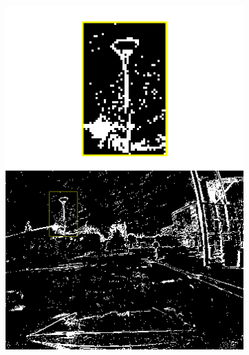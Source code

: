 \begin{figure}[t]
  \centering
  \begin{subfigure}{0.225\linewidth}
    \centering
    \includegraphics[width=\linewidth]{mainmatter/figures/3_optical_flow/denoising_filling/input.png}
    \caption{}\label{subfig:ebof:denoising_filling:in}
  \end{subfigure}
  \hspace{1mm}
  \begin{subfigure}{0.225\linewidth}
    \centering

\end{subfigure}
\end{figure}
